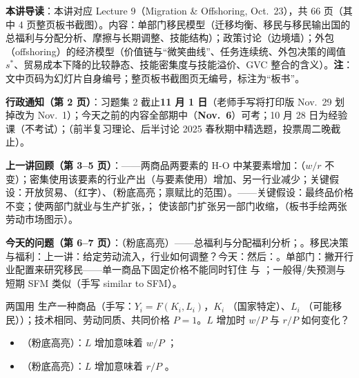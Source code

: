 
\textbf{本讲导读}：本讲对应 Lecture 9（Migration \& Offshoring, Oct.\ 23），共 66 页（其中 4 页整页板书截图）。内容：单部门移民模型（迁移均衡、移民与移民输出国的总福利与分配分析、摩擦与长期调整、技能结构）；政策讨论（边境墙）；外包（offshoring）的经济模型（价值链与``微笑曲线''、任务连续统、外包决策的阈值 $s^*$、贸易成本下降的比较静态、技能密集度与技能溢价、GVC 整合的含义）。\textbf{注}：文中页码为幻灯片自身编号；整页板书截图页无编号，标注为``板书''。


\textbf{行政通知（第 2 页）}：习题集 2 截止\textbf{11 月 1 日}（老师手写将打印版 Nov.\ 29 划掉改为 Nov.\ 1）；今天之前的内容全部期中（\textbf{Nov.\ 6}）可考；10 月 28 日为经验课（不考试）；（前半复习理论、后半讨论 2025 春秋期中精选题，投票周二晚截止）。

\textbf{上一讲回顾（第 3--5 页）}：——两商品两要素的 H-O 中某要素增加：（$w/r$ 不变）；密集使用该要素的行业产出（与要素使用）增加、另一行业减少；关键假设：开放贸易、（红字）、（粉底高亮；禀赋比的范围）。——关键假设：最终品价格不变；使两部门就业与生产扩张，； 使该部门扩张另一部门收缩，（板书手绘两张劳动市场图示）。

\textbf{今天的问题（第 6--7 页）}：（粉底高亮）——总福利与分配福利分析；。移民决策与福利：上一讲：给定劳动流入，行业如何调整？今天：然后：。单部门：撇开行业配置来研究移民——单一商品下固定价格不能同时钉住  与 ；一般得/失预测与短期 SFM 类似（手写 similar to SFM）。


\begin{assumpbox}[模型设定（第 8 页）]
两国用 生产一种商品（手写：$Y_i = F(K_i, L_i)$，$K_i$ （国家特定）、$L_i$ （可能移民））；技术相同、劳动同质、共同价格 $P = 1$。$L$ 增加时 $w/P$ 与 $r/P$ 如何变化？
\begin{itemize}
  \item {}（粉底高亮）：$L$ 增加意味着 $w/P$ ；
  \item {}（粉底高亮）：$L$ 增加意味着 $r/P$ 。
\end{itemize}
\end{assumpbox}

